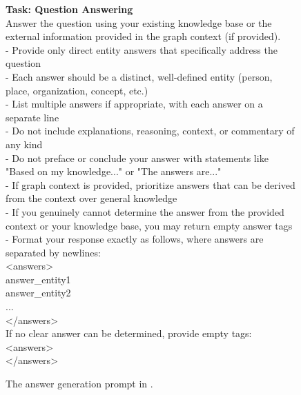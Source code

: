 
\begin{figure}
\begin{minipage}{1\columnwidth}
    \centering
\begin{tcolorbox}[title=\glink's Draft Answer Generation Prompt]
        \small
        \vspace{10pt}
        \textbf{Task: Question Answering} \\
        Answer the question using your existing knowledge base or the external information provided in the graph context (if provided).  \\
    - Provide only direct entity answers that specifically address the question \\
    - Each answer should be a distinct, well-defined entity (person, place, organization, concept, etc.) \\
    - List multiple answers if appropriate, with each answer on a separate line \\
    - Do not include explanations, reasoning, context, or commentary of any kind \\
    - Do not preface or conclude your answer with statements like "Based on my knowledge..." or "The answers are..." \\
    - If graph context is provided, prioritize answers that can be derived from the context over general knowledge\\
    - If you genuinely cannot determine the answer from the provided context or your knowledge base, you may return empty answer tags\\
    - Format your response exactly as follows, where answers are separated by newlines:\\

    <answers>\\
    answer\_entity1\\
    answer\_entity2\\
      ... \\
    </answers> \\

    If no clear answer can be determined, provide empty tags: \\
    <answers> \\
    </answers> \\
    \end{tcolorbox}

\caption{The answer generation prompt in \glink. }
\label{fig:linker-answer-prompt}
\end{minipage}
\end{figure}
